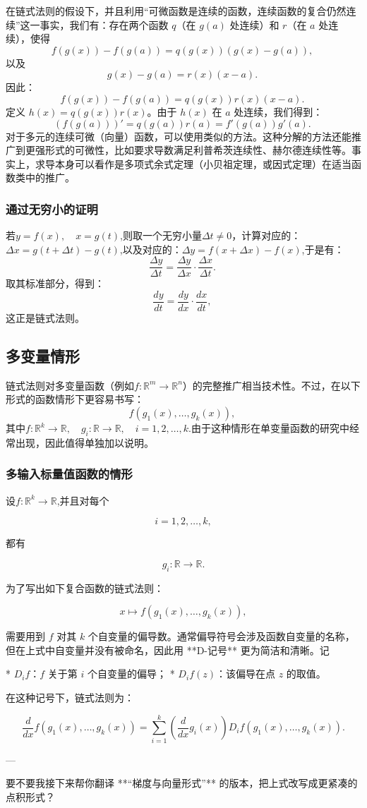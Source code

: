 在链式法则的假设下，并且利用“可微函数是连续的函数，连续函数的复合仍然连续”这一事实，我们有：存在两个函数 $q$（在 $g(a)$ 处连续）和 $r$（在 $a$ 处连续），使得
$$
f(g(x)) - f(g(a)) = q(g(x))(g(x) - g(a)),~
$$
以及
$$
g(x) - g(a) = r(x)(x-a).~
$$
因此：
$$
f(g(x)) - f(g(a)) = q(g(x))r(x)(x-a).~
$$
定义 $h(x) = q(g(x))r(x)$。由于 $h(x)$ 在 $a$ 处连续，我们得到：
$$
(f(g(a)))' = q(g(a))r(a) = f'(g(a))g'(a).~
$$
对于多元的连续可微（向量）函数，可以使用类似的方法。这种分解的方法还能推广到更强形式的可微性，比如要求导数满足利普希茨连续性、赫尔德连续性等。事实上，求导本身可以看作是多项式余式定理（小贝祖定理，或因式定理）在适当函数类中的推广。
\subsubsection{通过无穷小的证明}
若$y = f(x), \quad x = g(t)$,则取一个无穷小量$\Delta t \neq 0$，计算对应的：$\Delta x = g(t+\Delta t) - g(t)$,以及对应的：$\Delta y = f(x+\Delta x) - f(x)$,于是有：
$$
\frac{\Delta y}{\Delta t} = \frac{\Delta y}{\Delta x} \cdot \frac{\Delta x}{\Delta t}.~
$$
取其标准部分，得到：
$$
\frac{dy}{dt} = \frac{dy}{dx} \cdot \frac{dx}{dt},~
$$
这正是链式法则。
\subsection{多变量情形}
链式法则对多变量函数（例如$f: \mathbb{R}^m \to \mathbb{R}^n$）的完整推广相当技术性。不过，在以下形式的函数情形下更容易书写：
$$
f(g_{1}(x), \dots, g_{k}(x)),~
$$
其中$f: \mathbb{R}^k \to \mathbb{R},\quad g_i: \mathbb{R} \to \mathbb{R}, \quad i=1,2,\dots,k$.由于这种情形在单变量函数的研究中经常出现，因此值得单独加以说明。
\subsubsection{多输入标量值函数的情形}
设$f: \mathbb{R}^k \to \mathbb{R}$,并且对每个

$$
i = 1, 2, \dots, k,
$$

都有

$$
g_i: \mathbb{R} \to \mathbb{R}.
$$

为了写出如下复合函数的链式法则：

$$
x \mapsto f(g_1(x), \dots, g_k(x)),
$$

需要用到 $f$ 对其 $k$ 个自变量的偏导数。通常偏导符号会涉及函数自变量的名称，但在上式中自变量并没有被命名，因此用 **D-记号** 更为简洁和清晰。记

* $D_i f$：$f$ 关于第 $i$ 个自变量的偏导；
* $D_i f(z)$：该偏导在点 $z$ 的取值。

在这种记号下，链式法则为：

$$
\frac{d}{dx} f(g_1(x), \dots, g_k(x)) 
= \sum_{i=1}^k \left( \frac{d}{dx} g_i(x) \right) D_i f(g_1(x), \dots, g_k(x)).
$$

---

要不要我接下来帮你翻译 **“梯度与向量形式”** 的版本，把上式改写成更紧凑的点积形式？
